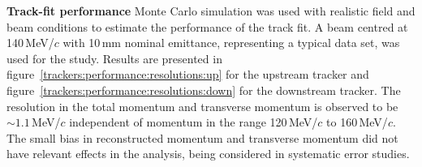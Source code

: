 \noindent\textbf{Track-fit performance}
\noindent
Monte Carlo simulation was used with realistic field and beam
conditions to estimate the performance of the track fit.
A beam centred at 140\,MeV/$c$ with 10\,mm nominal emittance,
representing a typical data set, was used for the study.
Results are presented in
figure~\ref{trackers:performance:resolutions:up} for the upstream
tracker and figure~\ref{trackers:performance:resolutions:down} for the
downstream tracker.
The resolution in the total momentum and transverse momentum is
observed to be $\sim 1.1$\,MeV/$c$ independent of momentum in the range
120\,MeV/$c$ to 160\,MeV/$c$.
The small bias in reconstructed momentum and transverse momentum did not have relevant effects in the analysis, being considered in systematic error studies.
